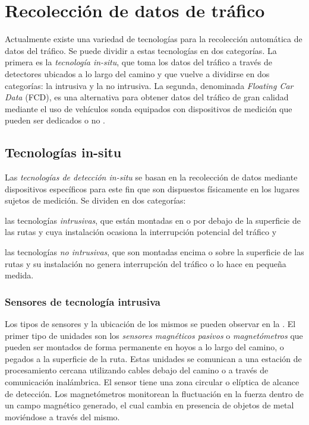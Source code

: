 \chapter{Recolección de datos de tráfico}
\label{cap:3}

Actualmente existe una variedad de tecnologías para la recolección automática de datos del tráfico. Se puede dividir a estas tecnologías en dos categorías. La primera es la \emph{tecnología in-situ}, que toma los datos del tráfico a través de detectores ubicados a lo largo del camino y que vuelve a dividirse en dos categorías: la intrusiva y la no intrusiva. La segunda, denominada \emph{Floating Car Data} (FCD), es una alternativa para obtener datos del tráfico de gran calidad mediante el uso de vehículos sonda equipados con dispositivos de medición que pueden ser dedicados o no \citep{mimbela2003summary}.

\section{Tecnologías in-situ}

Las \emph{tecnologías de detección in-situ} se basan en la recolección de datos mediante dispositivos específicos para este fin que son dispuestos físicamente en los lugares sujetos de medición. Se dividen en dos categorías: \begin{enumerate*}[a)] \item las tecnologías \emph{intrusivas}, que están montadas en o por debajo de la superficie de las rutas y cuya instalación ocasiona la interrupción potencial del tráfico y \item las tecnologías \emph{no intrusivas}, que son montadas encima o sobre la superficie de las rutas y su instalación no genera interrupción del tráfico o lo hace en pequeña medida.\end{enumerate*}

\subsection{Sensores de tecnología intrusiva}

Los tipos de sensores y la ubicación de los mismos se pueden observar en la . El primer tipo de unidades son los \emph{sensores magnéticos pasivos} o  \emph{magnetómetros} que pueden ser montados de forma permanente en hoyos a lo largo del camino, o pegados a la superficie de la ruta. Estas unidades se comunican a una estación de procesamiento cercana utilizando cables debajo del camino o a través de comunicación inalámbrica. El sensor tiene una zona circular o elíptica de alcance de detección. Los magnetómetros monitorean la fluctuación en la fuerza dentro de un campo magnético generado, el cual cambia en presencia de objetos de metal moviéndose a través del mismo.

